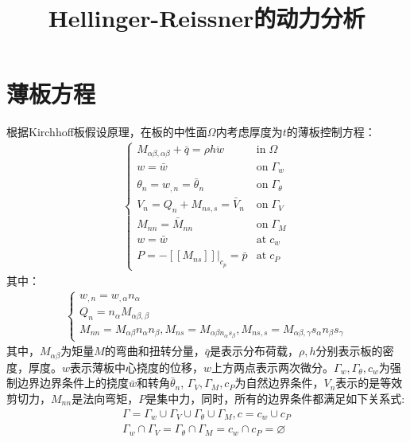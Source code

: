 \documentclass[11pt,a4paper]{article}
\begin{document}
\title{Hellinger-Reissner的动力分析}
\date{}
\maketitle
\section{薄板方程}
根据Kirchhoff板假设原理，在板的中性面$\Omega$内考虑厚度为$t$的薄板控制方程：
    \begin{equation}
        \begin{split}
        \begin{cases}
        M_{\alpha\beta,\alpha\beta}+\bar q=\rho h \ddot{w}&\text {in} \; \Omega\\
        w=\bar w&\text{on}\;\Gamma_w\\
        \theta_n=w_{,n}=\bar \theta_n&\text{on}\;\Gamma_{\theta}\\
        V_n=Q_n+M_{ns,s}=\bar V_n&\text {on}\;\Gamma_V\\
        M_{nn}=\bar M_{nn}&\text {on}\; \Gamma_M\\
        w=\bar w&\text {at} \; c_w\\
        P=-[[M_{ns}]]\vert_{c_p}=\bar p&\text {at}\; c_P
        \end{cases}
        \end{split}
    \end{equation}
其中：
\begin{equation}
\begin{split}
    \begin{cases}
    w_{,n}=w_{,\alpha}n_{\alpha}\\
Q_n=n_{\alpha}M_{\alpha\beta,\beta}\\
M_{nn}=M_{\alpha\beta}n_{\alpha}n_{\beta},M_{ns}=M_{\alpha\beta n_{\alpha}s_{\beta}},M_{ns,s}=M_{\alpha\beta,\gamma}s_{\alpha}n_{\beta}s_{\gamma}
    \end{cases}
\end{split}
\end{equation}
其中，$M_{\alpha\beta}$为矩量$M$的弯曲和扭转分量，$\bar q$是表示分布荷载，$\rho,h$分别表示板的密度，厚度。$w$表示薄板中心挠度的位移，$w$上方两点表示两次微分。$\Gamma_w,\Gamma_{\theta},c_w$为强制边界边界条件上的挠度$\bar w$和转角$\bar \theta_n$,
$\Gamma_V,\Gamma_M,c_P$为自然边界条件，$V_n$表示的是等效剪切力，$M_{nn}$是法向弯矩，$P$是集中力，同时，所有的边界条件都满足如下关系式:
\begin{equation}
    \begin{split}
    \Gamma=\Gamma_w\cup\Gamma_V\cup\Gamma_{\theta}\cup\Gamma_M,c=c_w\cup c_P\\
    \Gamma_w\cap\Gamma_V=\Gamma_{\theta}\cap\Gamma_M=c_w\cap c_P=\varnothing
    \end{split}
    \end{equation}
\end{document}
